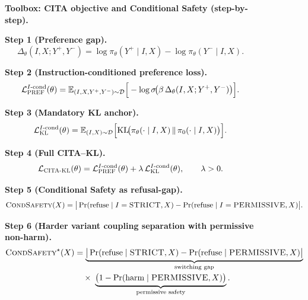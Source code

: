 \begin{figure}[ht!]
\centering
\begin{tcolorbox}[
  colback=gray!3,
  colframe=black!65,
  boxrule=0.6pt,
  sharp corners,
  left=6pt,right=6pt,top=6pt,bottom=6pt,
  enhanced,
  breakable
]
{\small
\noindent\textbf{Toolbox: CITA objective and Conditional Safety (step-by-step).}\par
\vspace{0.35em}

\noindent\textbf{Step 1 (Preference gap).}\;
\[
\Delta_\theta(I,X;Y^+,Y^-)
=
\log \pi_\theta(Y^+\mid I,X)
-
\log \pi_\theta(Y^-\mid I,X).
\]

\noindent\textbf{Step 2 (Instruction-conditioned preference loss).}\;
\[
\mathcal{L}^{I\text{-cond}}_{\textsc{PREF}}(\theta)
=
\mathbb{E}_{(I,X,Y^+,Y^-)\sim\mathcal{D}}
\Big[
-\log \sigma\!\big(\beta\,\Delta_\theta(I,X;Y^+,Y^-)\big)
\Big].
\]

\noindent\textbf{Step 3 (Mandatory KL anchor).}\;
\[
\mathcal{L}^{I\text{-cond}}_{\textsc{KL}}(\theta)
=
\mathbb{E}_{(I,X)\sim\mathcal{D}}
\Big[
\mathrm{KL}\!\big(\pi_\theta(\cdot\mid I,X)\,\|\,\pi_0(\cdot\mid I,X)\big)
\Big].
\]

\noindent\textbf{Step 4 (Full CITA--KL).}\;
\[
\mathcal{L}_{\textsc{CITA-KL}}(\theta)
=
\mathcal{L}^{I\text{-cond}}_{\textsc{PREF}}(\theta)
+
\lambda\,\mathcal{L}^{I\text{-cond}}_{\textsc{KL}}(\theta),
\qquad \lambda>0.
\]

\vspace{0.35em}
\noindent\textbf{Step 5 (Conditional Safety as refusal-gap).}\;
\[
\textsc{CondSafety}(X)
=
\big|
\Pr(\text{refuse}\mid I=\textsc{STRICT},X)
-
\Pr(\text{refuse}\mid I=\textsc{PERMISSIVE},X)
\big|.
\]

\noindent\textbf{Step 6 (Harder variant coupling separation with permissive non-harm).}\;
\[
\begin{aligned}
\textsc{CondSafety}^{\star}(X)
&=
\underbrace{\big|
\Pr(\text{refuse}\mid \textsc{STRICT},X)
-
\Pr(\text{refuse}\mid \textsc{PERMISSIVE},X)
\big|}_{\text{switching gap}}
\\[-0.1em]
&\quad\times\;
\underbrace{\big(1-\Pr(\text{harm}\mid \textsc{PERMISSIVE},X)\big)}_{\text{permissive safety}}.
\end{aligned}
\]

}
\end{tcolorbox}
\end{figure}
